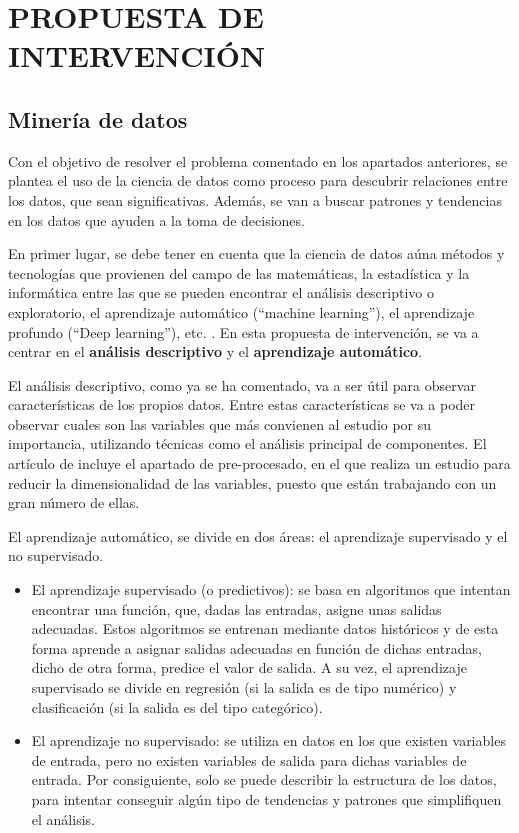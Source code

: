 \section{PROPUESTA DE INTERVENCIÓN}
\subsection{Minería de datos}
Con el objetivo de resolver el problema comentado en los apartados anteriores, se plantea el uso de la ciencia de datos como proceso para descubrir relaciones entre los datos, que sean significativas. Además, se van a buscar patrones y tendencias en los datos que ayuden a la toma de decisiones.

En primer lugar, se debe tener en cuenta que la ciencia de datos aúna métodos y tecnologías que provienen del campo de las matemáticas, la estadística y la informática entre las que se pueden encontrar el análisis descriptivo o exploratorio, el aprendizaje automático (“machine learning”), el aprendizaje profundo (“Deep learning”), etc. \cite{MARIN2018}. En esta propuesta de intervención, se va a centrar en el \textbf{análisis descriptivo} y el \textbf{aprendizaje automático}.

El análisis descriptivo, como ya se ha comentado, va a ser útil para observar características de los propios datos. Entre estas características se va a poder observar cuales son las variables que más convienen al estudio por su importancia, utilizando técnicas como el análisis principal de componentes. El artículo de  incluye el apartado de pre-procesado, en el que realiza un estudio para reducir la dimensionalidad de las variables, puesto que están trabajando con un gran número de ellas.

El aprendizaje automático, se divide en dos áreas: el aprendizaje supervisado y el no supervisado. 

\begin{itemize}
\item El aprendizaje supervisado (o predictivos): se basa en algoritmos que intentan encontrar una función, que, dadas las entradas, asigne unas salidas adecuadas. Estos algoritmos se entrenan mediante datos históricos y de esta forma aprende a asignar salidas adecuadas en función de dichas entradas, dicho de otra forma, predice el valor de salida. A su vez, el aprendizaje supervisado se divide en regresión (si la salida es de tipo numérico) y clasificación (si la salida es del tipo categórico). \cite{Recuero2017}
\item El aprendizaje no supervisado: se utiliza en datos en los que existen variables de entrada, pero no existen variables de salida para dichas variables de entrada. Por consiguiente, solo se puede describir la estructura de los datos, para intentar conseguir algún tipo de tendencias y patrones que simplifiquen el análisis.\cite{Recuero2017} \cite{rodriguez2009herramientas}
\end{itemize}

